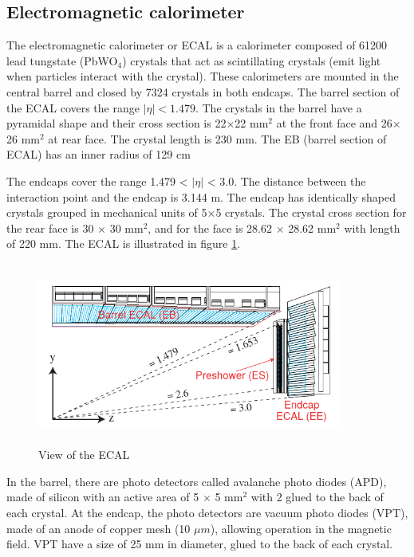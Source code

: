 \subsection{Electromagnetic calorimeter}

The electromagnetic calorimeter or ECAL is a calorimeter composed of 61200 lead tungstate (PbWO$_4$) crystals that act as scintillating crystals (emit light when particles interact with the crystal). These calorimeters are mounted in the central barrel and closed by 7324 crystals in both endcaps. The barrel section of the ECAL covers the range $|\eta| < 1.479$. The crystals in the barrel have a pyramidal shape and their cross section is 22$\times$22 mm$^2$ at the front face and 26$\times$26 mm$^2$ at rear face. The crystal length is 230 mm. The EB (barrel section of ECAL) has an inner radius of 129 cm\cite{cms-manual}

The endcaps cover the range 1.479 < $|\eta|$ < 3.0. The distance between the interaction point and the endcap is 3.144 m. The endcap has identically shaped crystals grouped in mechanical units of 5×5 crystals. The crystal cross section for the rear face is 30 $\times$ 30 mm$^2$, and for the face is 28.62 $\times$ 28.62 mm$^2$ with length of 220 mm. The ECAL is illustrated in figure \ref{ecal}.

\begin{figure}[ht]
	\centering
	\includegraphics[width=10cm,height=6cm]{Chapter2/ecal.png}
	\caption[View of the ECAL]{View of the ECAL\cite{cms-manual}}\label{ecal}
\end{figure}
In the barrel, there are photo detectors called avalanche photo diodes (APD), made of silicon with an active area of 5 $\times$ 5 mm$^2$ with 2 glued to the back of each crystal. At the endcap, the photo detectors are vacuum photo diodes (VPT), made of an anode of copper mesh (10 $\mu m$), allowing operation in the magnetic field. VPT have a size of 25 mm in diameter, glued to the back of each crystal.


